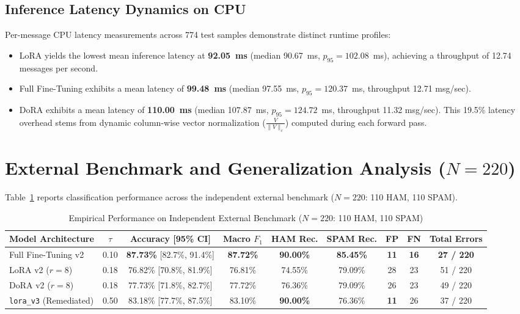 \documentclass[conference]{IEEEtran}
\begin{document}
\subsection{Inference Latency Dynamics on CPU}
Per-message CPU latency measurements across 774 test samples demonstrate distinct runtime profiles:
\begin{itemize}
    \item LoRA yields the lowest mean inference latency at \textbf{92.05~ms} (median 90.67~ms, $p_{95} = 102.08$~ms), achieving a throughput of 12.74 messages per second.
    \item Full Fine-Tuning exhibits a mean latency of \textbf{99.48~ms} (median 97.55~ms, $p_{95} = 120.37$~ms, throughput 12.71 msg/sec).
    \item DoRA exhibits a mean latency of \textbf{110.00~ms} (median 107.87~ms, $p_{95} = 124.72$~ms, throughput 11.32 msg/sec). This 19.5\% latency overhead stems from dynamic column-wise vector normalization ($\frac{V}{\|V\|_c}$) computed during each forward pass.
\end{itemize}

\section{External Benchmark and Generalization Analysis ($N=220$)}
\label{sec:benchmark_analysis}

Table~\ref{tab:benchmark_results} reports classification performance across the independent external benchmark ($N=220$: 110 HAM, 110 SPAM).

\begin{table}[t]
\caption{Empirical Performance on Independent External Benchmark ($N=220$: 110 HAM, 110 SPAM)}
\label{tab:benchmark_results}
\centering
\small
\begin{tabularx}{\textwidth}{lcccccccc}
\toprule
\textbf{Model Architecture} & \textbf{$\tau$} & \textbf{Accuracy [95\% CI]} & \textbf{Macro $F_1$} & \textbf{HAM Rec.} & \textbf{SPAM Rec.} & \textbf{FP} & \textbf{FN} & \textbf{Total Errors} \\
\midrule
Full Fine-Tuning v2 & 0.10 & \textbf{87.73\%} [82.7\%, 91.4\%] & \textbf{87.72\%} & \textbf{90.00\%} & \textbf{85.45\%} & \textbf{11} & \textbf{16} & \textbf{27 / 220} \\
LoRA v2 ($r=8$) & 0.18 & 76.82\% [70.8\%, 81.9\%] & 76.81\% & 74.55\% & 79.09\% & 28 & 23 & 51 / 220 \\
DoRA v2 ($r=8$) & 0.18 & 77.73\% [71.8\%, 82.7\%] & 77.72\% & 76.36\% & 79.09\% & 26 & 23 & 49 / 220 \\
\midrule
\texttt{lora\_v3} (Remediated) & 0.50 & 83.18\% [77.7\%, 87.5\%] & 83.10\% & \textbf{90.00\%} & 76.36\% & \textbf{11} & 26 & 37 / 220 \\
\bottomrule
\end{tabularx}
\end{table}
\end{document}
